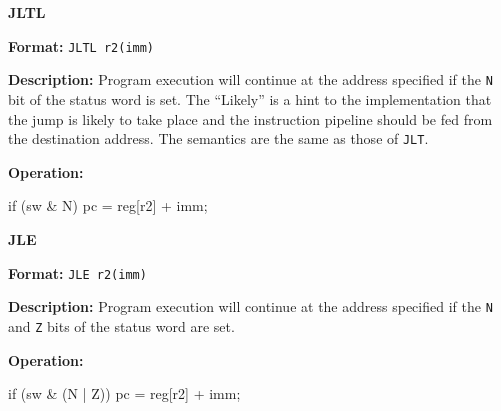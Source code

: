 \noindent\textsf{\textbf{\Large JLTL}}\par
{}\par\begin{indented}{\bf Format:}
{\tt JLTL r2(imm)}\par\vspace{3ex}
\end{indented}\vspace{4ex}
\begin{indented}{\bf Description:}
Program execution will continue at the address specified if the {\tt N} bit
of the status word is set.  The ``Likely'' is a hint to the implementation
that the jump is likely to take place and the instruction pipeline should
be fed from the destination address.  The semantics are the same as those
of {\tt JLT}.
\end{indented}
\begin{indented}{\bf Operation:}\vspace{.8ex}
\begin{verbatimtab}
if (sw & N) {
    pc = reg[r2] + imm;
}
\end{verbatimtab}
\end{indented}
\vspace{2em}

\newpage
\noindent\textsf{\textbf{\Large JLE}}\par
{}\par\begin{indented}{\bf Format:}
{\tt JLE r2(imm)}\par\vspace{3ex}
\end{indented}\vspace{4ex}
\begin{indented}{\bf Description:}
Program execution will continue at the address specified if the {\tt N} and
{\tt Z} bits of the status word are set.
\end{indented}
\begin{indented}{\bf Operation:}\vspace{.8ex}
\begin{verbatimtab}
if (sw & (N | Z)) {
    pc = reg[r2] + imm;
}
\end{verbatimtab}
\end{indented}
\vspace{2em}


